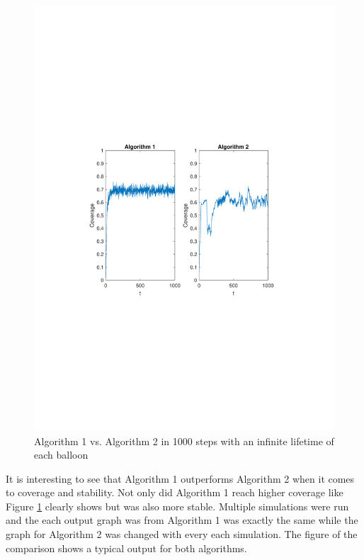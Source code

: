 \begin{figure}
\centering
\includegraphics[scale=0.7, trim={3cm 10cm 4cm 9cm},clip]{graphics/coverage_alg1_vs_alg2_1000steps_LIFETIMELONG.pdf}
\caption{Algorithm 1 vs. Algorithm 2 in 1000 steps with an infinite lifetime of each balloon}
\label{fig:alg1vsalg2}
\end{figure}
It is interesting to see that Algorithm 1 outperforms Algorithm 2 when it comes to coverage and stability. Not only did Algorithm 1 reach higher coverage like Figure \ref{fig:alg1vsalg2} clearly shows but was also more stable. Multiple simulations were run and the each output graph was from Algorithm 1 was exactly the same while the graph for Algorithm 2 was changed with every each simulation. The figure of the comparison shows a typical output for both algorithms.

